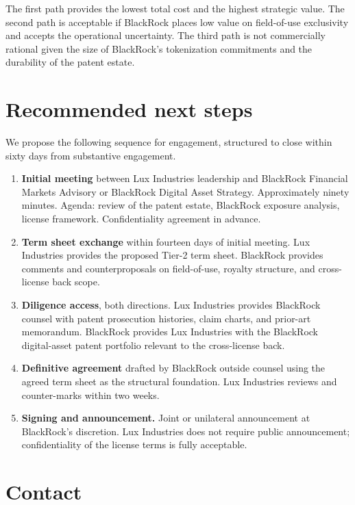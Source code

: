 \documentclass[11pt,letterpaper]{article}
\begin{document}
The first path provides the lowest total cost and the highest strategic value. The second path is acceptable if BlackRock places low value on field-of-use exclusivity and accepts the operational uncertainty. The third path is not commercially rational given the size of BlackRock's tokenization commitments and the durability of the patent estate.

\section{Recommended next steps}

We propose the following sequence for engagement, structured to close within sixty days from substantive engagement.

\begin{enumerate}[label=\textbf{Step \arabic*.}]
\item \textbf{Initial meeting} between Lux Industries leadership and BlackRock Financial Markets Advisory or BlackRock Digital Asset Strategy. Approximately ninety minutes. Agenda: review of the patent estate, BlackRock exposure analysis, license framework. Confidentiality agreement in advance.
\item \textbf{Term sheet exchange} within fourteen days of initial meeting. Lux Industries provides the proposed Tier-2 term sheet. BlackRock provides comments and counterproposals on field-of-use, royalty structure, and cross-license back scope.
\item \textbf{Diligence access}, both directions. Lux Industries provides BlackRock counsel with patent prosecution histories, claim charts, and prior-art memorandum. BlackRock provides Lux Industries with the BlackRock digital-asset patent portfolio relevant to the cross-license back.
\item \textbf{Definitive agreement} drafted by BlackRock outside counsel using the agreed term sheet as the structural foundation. Lux Industries reviews and counter-marks within two weeks.
\item \textbf{Signing and announcement.} Joint or unilateral announcement at BlackRock's discretion. Lux Industries does not require public announcement; confidentiality of the license terms is fully acceptable.
\end{enumerate}

\section{Contact}
\end{document}
